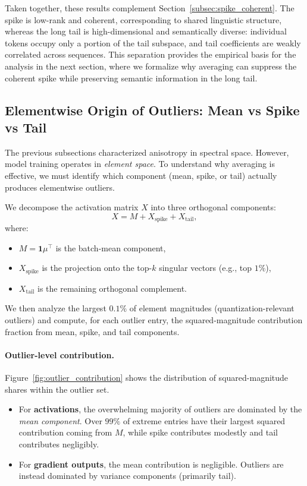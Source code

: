 Taken together, these results complement
Section~\ref{subsec:spike_coherent}.
The spike is low-rank and coherent, corresponding to shared linguistic
structure, whereas the long tail is high-dimensional and semantically diverse:
individual tokens occupy only a portion of the tail subspace, and tail
coefficients are weakly correlated across sequences.
This separation provides the empirical basis for the analysis in the next
section, where we formalize why averaging can suppress the coherent spike while
preserving semantic information in the long tail.

\subsection{Elementwise Origin of Outliers: Mean vs Spike vs Tail}
\label{subsec:outlier_origin}

The previous subsections characterized anisotropy in spectral space.
However, model training operates in \emph{element space}.
To understand why averaging is effective, we must identify which component
(mean, spike, or tail) actually produces elementwise outliers.

We decompose the activation matrix $X$ into three orthogonal components:
\[
X = M + X_{\text{spike}} + X_{\text{tail}},
\]
where:
\begin{itemize}
    \item $M = \mathbf{1}\mu^\top$ is the batch-mean component,
    \item $X_{\text{spike}}$ is the projection onto the top-$k$ singular vectors
          (e.g., top $1\%$),
    \item $X_{\text{tail}}$ is the remaining orthogonal complement.
\end{itemize}

We then analyze the largest $0.1\%$ of element magnitudes (quantization-relevant outliers)
and compute, for each outlier entry, the squared-magnitude contribution fraction from
mean, spike, and tail components.

\paragraph{Outlier-level contribution.}

Figure~\ref{fig:outlier_contribution} shows the distribution of squared-magnitude
shares within the outlier set.

\begin{itemize}
    \item For \textbf{activations}, the overwhelming majority of outliers are dominated
          by the \emph{mean component}. Over $99\%$ of extreme entries have their largest
          squared contribution coming from $M$, while spike contributes modestly and tail
          contributes negligibly.
    \item For \textbf{gradient outputs}, the mean contribution is negligible.
          Outliers are instead dominated by variance components (primarily tail).
\end{itemize}

